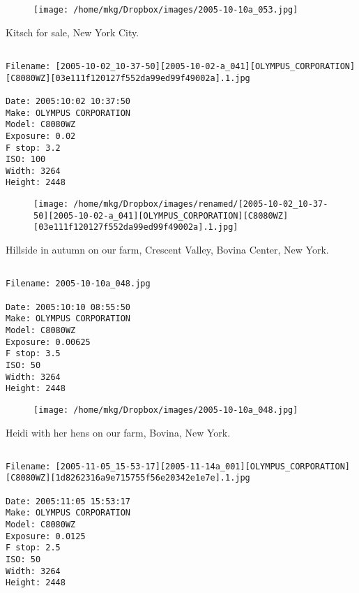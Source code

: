 \begin{figure}
\texttt{[image: /home/mkg/Dropbox/images/2005-10-10a\_053.jpg]}
\end{figure}
    
\clearpage
\onecolumn
\noindent Kitsch for sale, New York City.
\noindent
\begin{lstlisting}

Filename: [2005-10-02_10-37-50][2005-10-02-a_041][OLYMPUS_CORPORATION][C8080WZ][03e111f120127f552da99ed99f49002a].1.jpg

Date: 2005:10:02 10:37:50
Make: OLYMPUS CORPORATION
Model: C8080WZ
Exposure: 0.02
F stop: 3.2
ISO: 100
Width: 3264
Height: 2448
\end{lstlisting}
\clearpage

\begin{figure}
\texttt{[image: /home/mkg/Dropbox/images/renamed/[2005-10-02\_10-37-50][2005-10-02-a\_041][OLYMPUS\_CORPORATION][C8080WZ][03e111f120127f552da99ed99f49002a].1.jpg]}
\end{figure}
    
\clearpage
\onecolumn
\noindent Hillside in autumn on our farm, Crescent Valley, Bovina Center, New York.
\noindent
\begin{lstlisting}

Filename: 2005-10-10a_048.jpg

Date: 2005:10:10 08:55:50
Make: OLYMPUS CORPORATION
Model: C8080WZ
Exposure: 0.00625
F stop: 3.5
ISO: 50
Width: 3264
Height: 2448
\end{lstlisting}
\clearpage

\begin{figure}
\texttt{[image: /home/mkg/Dropbox/images/2005-10-10a\_048.jpg]}
\end{figure}
    
\clearpage
\onecolumn
\noindent Heidi with her hens on our farm, Bovina, New York.
\noindent
\begin{lstlisting}

Filename: [2005-11-05_15-53-17][2005-11-14a_001][OLYMPUS_CORPORATION][C8080WZ][1d8262316a9e715755f56e20342e1e7e].1.jpg

Date: 2005:11:05 15:53:17
Make: OLYMPUS CORPORATION
Model: C8080WZ
Exposure: 0.0125
F stop: 2.5
ISO: 50
Width: 3264
Height: 2448
\end{lstlisting}
\clearpage


